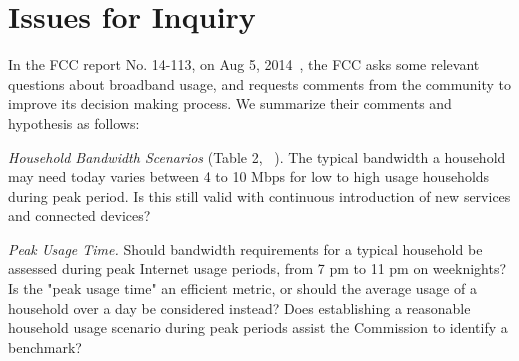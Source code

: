 \section{Issues for Inquiry}
\label{sec:issues}

In the FCC report No. 14-113, on Aug 5, 2014~\cite{fcc2015progress-report}, the FCC asks some relevant questions about broadband usage, and requests comments from the community to improve its decision making process. We summarize their comments and hypothesis as follows:

 \emph{Household Bandwidth Scenarios} (Table 2, ~\cite{fcc2015progress-report}). The typical bandwidth a household may need today varies between 4 to 10 Mbps for low to high usage households during peak period. Is this still valid with continuous introduction of new services and connected devices?


 \emph{Peak Usage Time.} Should bandwidth requirements for a typical household be assessed during peak Internet usage periods, from 7 pm to 11 pm on weeknights? Is the "peak usage time" an efficient metric, or should the average usage of a household over a day be considered instead? Does establishing a reasonable household usage scenario during peak periods assist the Commission to identify a benchmark?


